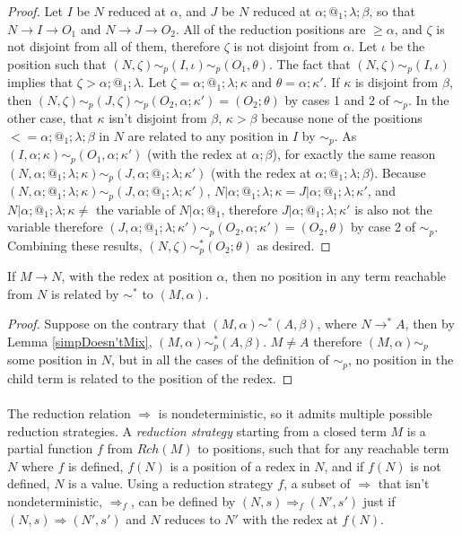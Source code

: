 \begin{proof}
Let $I$ be $N$ reduced at $\alpha$, and $J$ be $N$ reduced at $\alpha;@_1;\lambda;\beta$, so that $N \to I \to O_1$ and $N \to J \to O_2$. All of the reduction positions are $\geq \alpha$, and $\zeta$ is not disjoint from all of them, therefore $\zeta$ is not disjoint from $\alpha$. Let $\iota$ be the position such that $(N,\zeta) \sim_p (I,\iota) \sim_p (O_1,\theta)$. The fact that $(N,\zeta) \sim_p (I,\iota)$ implies that $\zeta > \alpha;@_1;\lambda$. Let $\zeta = \alpha;@_1;\lambda;\kappa$ and $\theta = \alpha;\kappa'$. If $\kappa$ is disjoint from $\beta$, then $(N,\zeta) \sim_p (J,\zeta) \sim_p (O_2,\alpha;\kappa') = (O_2;\theta)$ by cases 1 and 2 of $\sim_p$. In the other case, that $\kappa$ isn't disjoint from $\beta$, $\kappa > \beta$ because none of the positions $<= \alpha;@_1;\lambda;\beta$ in $N$ are related to any position in $I$ by $\sim_p$. As $(I,\alpha;\kappa) \sim_p (O_1,\alpha;\kappa')$ (with the redex at $\alpha;\beta$), for exactly the same reason $(N,\alpha;@_1;\lambda;\kappa) \sim_p (J,\alpha;@_1;\lambda;\kappa')$ (with the redex at $\alpha;@_1;\lambda;\beta$). Because $(N,\alpha;@_1;\lambda;\kappa) \sim_p (J,\alpha;@_1;\lambda;\kappa')$, $N|\alpha;@_1;\lambda;\kappa = J|\alpha;@_1;\lambda;\kappa'$, and $N|\alpha;@_1;\lambda;\kappa \neq $ the variable of $N|\alpha;@_1$, therefore $J|\alpha;@_1;\lambda;\kappa'$ is also not the variable therefore $(J,\alpha;@_1;\lambda;\kappa') \sim_p (O_2, \alpha;\kappa') = (O_2, \theta)$ by case 2 of $\sim_p$. Combining these results, $(N,\zeta) \sim_p^* (O_2;\theta)$ as desired.
\end{proof}

\begin{lemma} \label{lem:redexDestroyed}
If $M \to N$, with the redex at position $\alpha$, then no position in any term reachable from $N$ is related by $\sim^*$ to $(M,\alpha)$.
\end{lemma}
\begin{proof}
Suppose on the contrary that $(M,\alpha) \sim^* (A,\beta)$, where $N \to^* A$, then by Lemma \ref{simpDoesn'tMix}, $(M,\alpha) \sim_p^* (A,\beta)$. $M \neq A$ therefore $(M,\alpha) \sim_p$ some position in $N$, but in all the cases of the definition of $\sim_p$, no position in the child term is related to the position of the redex.
\end{proof}

\paragraph{}
The reduction relation $\Rightarrow$ is nondeterministic, so it admits multiple possible reduction strategies. 
A \emph{reduction strategy} starting from a closed term $M$ is a partial function $f$ from $Rch(M)$ to positions, such that for any reachable term $N$ where $f$ is defined, $f(N)$ is a position of a redex in $N$, and if $f(N)$ is not defined, $N$ is a value.
Using a reduction strategy $f$, a subset of $\Rightarrow$ that isn't nondeterministic, $\Rightarrow_f$, can be defined by $(N,s) \Rightarrow_f (N',s')$ just if $(N,s) \Rightarrow (N',s')$ and $N$ reduces to $N'$ with the redex at $f(N)$.

